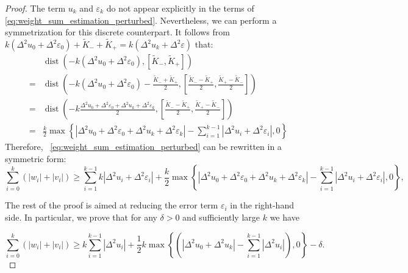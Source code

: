 \documentclass[10pt,a4paper]{amsart}
\begin{document}
\begin{proof}
The term $u_k$ and $\varepsilon_k$ do not appear explicitly in the terms of \eqref{eq:weight_sum_estimation_perturbed}. Nevertheless, we can perform a symmetrization for this discrete counterpart.
It follows from $k(\Delta^2 u_0+\Delta^2 \varepsilon_0)+\widetilde K_-+\widetilde K_{+} = k(\Delta^2 u_k+\Delta^2\varepsilon)$ that:
\begin{equation}
    \begin{aligned}
        &\operatorname{dist}\left( - k(\Delta^2 u_0+\Delta^2 \varepsilon_0),[\widetilde K_-, \widetilde K_+] \right) \\
        =&\operatorname{dist}\left( - k\left(\Delta^2 u_0+\Delta^2 \varepsilon_0\right)-\frac{\widetilde K_-+\widetilde K_+}{2},\left[\frac{\widetilde K_--\widetilde K_+}{2}, \frac{\widetilde K_+-\widetilde K_-}{2}\right] \right)\\
        = & \operatorname{dist}\left( -k\frac{\Delta^2 u_0+\Delta^2 \varepsilon_0+\Delta^2 u_k+\Delta^2\varepsilon_k}{2},\left[\frac{\widetilde K_--\widetilde K_+}{2}, \frac{\widetilde K_+-\widetilde K_-}{2}\right] \right)\\
        =& \frac{k}{2} \max\left\{|\Delta^2 u_0+\Delta^2 \varepsilon_0 + \Delta^2 u_k+\Delta^2 \varepsilon_k|-\sum_{i=1}^{k-1} |\Delta^2 u_i+\Delta^2 \varepsilon_i|, 0\right\}
    \end{aligned}
\end{equation}
Therefore, ~\eqref{eq:weight_sum_estimation_perturbed} can be rewritten in a symmetric form:
\begin{equation}
\label{eq:weight_sum_estimation_perturbed_symmetric}
 \sum_{i=0}^{k} (|w_i|+|v_i|)\ge \sum_{i=1}^{k-1} k|\Delta^2 u_i+\Delta^2 \varepsilon_i| + \frac{k}{2} \max\left\{|\Delta^2 u_0+\Delta^2 \varepsilon_0 + \Delta^2 u_k+\Delta^2 \varepsilon_k|-\sum_{i=1}^{k-1} |\Delta^2 u_i+\Delta^2 \varepsilon_i|, 0\right\},
\end{equation}

The rest of the proof is aimed at reducing the error term $\varepsilon_i$ in the right-hand side. In particular, we prove that for any $\delta > 0$
and sufficiently large $k$ we have

\begin{equation}
    \sum_{i=0}^k \left(|w_i|+|v_i|\right)\ge k\sum_{i=1}^{k-1} |\Delta^2 u_i|+ \frac 1 2 k\max \left\{ \left( |\Delta^2 u_0 + \Delta^2 u_k|-\sum_{i=1}^{k-1} |\Delta^2 u_i|\right), 0 \right\}- \delta.
\end{equation}



\end{proof}
\end{document}
